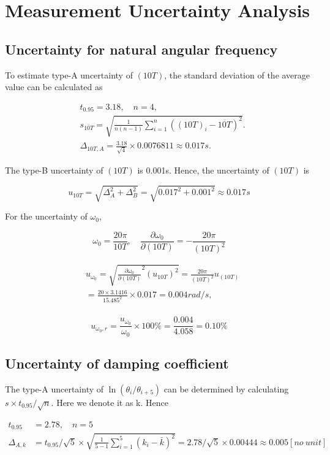 \section{Measurement Uncertainty Analysis}

\subsection{Uncertainty for natural angular frequency}

To estimate type-A uncertainty of $(10T)$,
the standard deviation of the average value can be calculated as

\[
\begin{split}
&t_{0.95}=3.18,\quad n=4,\\
&s_{\overline{10T}}=\sqrt{\frac{1}{n(n-1)}\sum_{i=1}^n((10T)_i-\overline{10T})^2}.\\ 
&\Delta_{10T,A}=\frac{3.18}{\sqrt{4}}\times0.0076811\approx 0.017s.
\end{split}
\]

The type-B uncertainty of $(10T)$ is 0.001s. Hence, the uncertainty of $(10T)$ is

$$ u_{10T}=\sqrt{\Delta_A^2+\Delta_B^2}=\sqrt{0.017^2+0.001^2}\approx 0.017s $$  

For the uncertainty of $\omega_0$,

$$\omega_0=\frac{20\pi}{10T},\quad \frac{\partial \omega_0}{\partial
  (10T)}=-\frac{20\pi}{(10T)^2}$$ 

\[
\begin{split}
&u_{\omega_0}=\sqrt{\frac{\partial \omega_0}{\partial
    (10T)}^2(u_{10T})^2}=\frac{20\pi}{(10T)^2}u_{(10T)}\\
&=\frac{20\times3.1416}{15.485^2} \times 0.017 = 0.004rad/s,\\  
\end{split}
\]

$$ u_{\omega_0,r}=\frac{u_{\omega_0}}{\omega_0}\times100\%
=\frac{0.004}{4.058}=0.10\% $$ 

\subsection{Uncertainty of damping coefficient}

The type-A uncertainty of $\ln(\theta_i/\theta_{i+5})$ can be determined by
calculating $s\times t_{0.95}/\sqrt{n}$. Here we denote it as k. Hence  

\[
\begin{split}
t_{0.95}&=2.78,\quad n=5\\
\Delta_{A,k}&=t_{0.95}/\sqrt{5}\times
\sqrt{\frac{1}{5-1}\sum_{i=1}^5(k_i-\bar{k})^2}=2.78/\sqrt{5}\times
0.00444\approx0.005[no\ unit] 
\end{split}
\]

